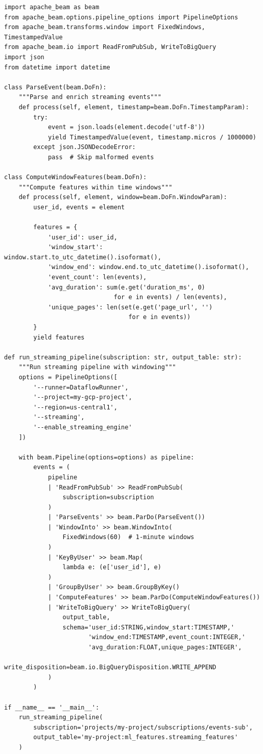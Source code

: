 \begin{lstlisting}[style=python, caption=Apache Beam streaming pipeline with windowing]
import apache_beam as beam
from apache_beam.options.pipeline_options import PipelineOptions
from apache_beam.transforms.window import FixedWindows, TimestampedValue
from apache_beam.io import ReadFromPubSub, WriteToBigQuery
import json
from datetime import datetime

class ParseEvent(beam.DoFn):
    """Parse and enrich streaming events"""
    def process(self, element, timestamp=beam.DoFn.TimestampParam):
        try:
            event = json.loads(element.decode('utf-8'))
            yield TimestampedValue(event, timestamp.micros / 1000000)
        except json.JSONDecodeError:
            pass  # Skip malformed events

class ComputeWindowFeatures(beam.DoFn):
    """Compute features within time windows"""
    def process(self, element, window=beam.DoFn.WindowParam):
        user_id, events = element

        features = {
            'user_id': user_id,
            'window_start': window.start.to_utc_datetime().isoformat(),
            'window_end': window.end.to_utc_datetime().isoformat(),
            'event_count': len(events),
            'avg_duration': sum(e.get('duration_ms', 0)
                              for e in events) / len(events),
            'unique_pages': len(set(e.get('page_url', '')
                                  for e in events))
        }
        yield features

def run_streaming_pipeline(subscription: str, output_table: str):
    """Run streaming pipeline with windowing"""
    options = PipelineOptions([
        '--runner=DataflowRunner',
        '--project=my-gcp-project',
        '--region=us-central1',
        '--streaming',
        '--enable_streaming_engine'
    ])

    with beam.Pipeline(options=options) as pipeline:
        events = (
            pipeline
            | 'ReadFromPubSub' >> ReadFromPubSub(
                subscription=subscription
            )
            | 'ParseEvents' >> beam.ParDo(ParseEvent())
            | 'WindowInto' >> beam.WindowInto(
                FixedWindows(60)  # 1-minute windows
            )
            | 'KeyByUser' >> beam.Map(
                lambda e: (e['user_id'], e)
            )
            | 'GroupByUser' >> beam.GroupByKey()
            | 'ComputeFeatures' >> beam.ParDo(ComputeWindowFeatures())
            | 'WriteToBigQuery' >> WriteToBigQuery(
                output_table,
                schema='user_id:STRING,window_start:TIMESTAMP,'
                       'window_end:TIMESTAMP,event_count:INTEGER,'
                       'avg_duration:FLOAT,unique_pages:INTEGER',
                write_disposition=beam.io.BigQueryDisposition.WRITE_APPEND
            )
        )

if __name__ == '__main__':
    run_streaming_pipeline(
        subscription='projects/my-project/subscriptions/events-sub',
        output_table='my-project:ml_features.streaming_features'
    )
\end{lstlisting}


